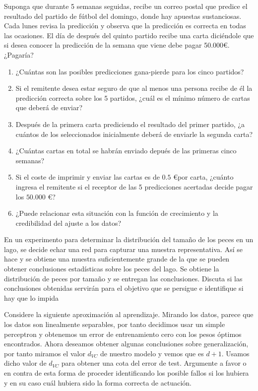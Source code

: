 \documentclass[11pt,leqno]{article}
\theoremstyle{definition}
\begin{document}
\begin{cuestion}
Suponga que durante 5 semanas seguidas, recibe un correo postal que predice el resultado del partido de fútbol del domingo, donde hay apuestas sustanciosas. Cada lunes revisa la predicción y observa que la predicción es correcta en todas las ocasiones. El día de después del quinto partido recibe una carta diciéndole que si desea conocer la predicción de la semana que viene debe pagar 50.000\euro. ¿Pagaría?
\begin{enumerate}[a]
\item ¿Cuántas son las posibles predicciones gana-pierde para los cinco partidos?
\item Si el remitente desea estar seguro de que al menos una persona recibe de él la predicción correcta sobre los 5 partidos, ¿cuál es el mínimo número de cartas que deberá de
enviar?
\item Después de la primera carta prediciendo el resultado del primer partido, ¿a cuántos de los seleccionados inicialmente deberá de enviarle la segunda carta?
\item ¿Cuántas cartas en total se habrán enviado depués de las primeras cinco semanas?
\item  Si el coste de imprimir y enviar las cartas es de $0.5$ \euro por carta, ¿cuánto ingresa el remitente si el receptor de las 5 predicciones acertadas decide pagar los $50.000$ \euro ?
\item ¿Puede relacionar esta situación con la función de crecimiento y la credibilidad del ajuste a los datos?
\end{enumerate}
\end{cuestion}

\begin{solucion}
\end{solucion}

\begin{cuestion}
En un experimento para determinar la distribución del tamaño de los peces en un lago, se decide echar una red para capturar una muestra representativa. Así se hace y se obtiene una muestra suficientemente grande de la que se pueden obtener conclusiones estadísticas sobre los peces del lago. Se obtiene la distribución de peces por tamaño y se entregan las conclusiones. Discuta si las conclusiones obtenidas servirán para el objetivo que se persigue
e identifique si hay que lo impida
\end{cuestion}

\begin{cuestion}
Considere la siguiente aproximación al aprendizaje. Mirando los datos, parece que los datos son linealmente separables, por tanto decidimos usar un simple perceptron y obtenemos un error de entrenamiento cero con los pesos óptimos encontrados. Ahora deseamos obtener algunas conclusiones sobre generalización, por tanto miramos el valor $d_{VC}$ de nuestro modelo
y vemos que es $d + 1$. Usamos dicho valor de $d_{VC}$ para obtener una cota del error de test. Argumente a favor o en contra de esta forma de proceder identificando los posible fallos si los hubiera y en su caso cuál hubiera sido la forma correcta de actuación.
\end{cuestion}
\end{document}
